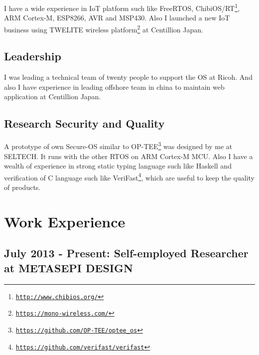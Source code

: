 \documentclass[letterpaper]{article}
\begin{document}
I have a wide experience in IoT platform such like FreeRTOS, ChibiOS/RT\footnote{\href{http://www.chibios.org/}{\tt http://www.chibios.org/}}, ARM Cortex-M, ESP8266, AVR and MSP430. Also I launched a new IoT business using TWELITE wireless platform\footnote{\href{https://mono-wireless.com/}{\tt https://mono-wireless.com/}} at Centillion Japan.

\subsection*{Leadership}

I was leading a technical team of twenty people to support the OS at Ricoh. And also I have experience in leading offshore team in china to maintain web application at Centillion Japan.

\subsection*{Research Security and Quality}

A prototype of own Secure-OS similar to OP-TEE\footnote{\href{https://github.com/OP-TEE/optee\_os}{\tt https://github.com/OP-TEE/optee\_os}} was designed by me at SELTECH. It runs with the other RTOS on ARM Cortex-M MCU. Also I have a wealth of experience in strong static typing language such like Haskell and verification of C language such like VeriFast\footnote{\href{https://github.com/verifast/verifast}{\tt https://github.com/verifast/verifast}}, which are useful to keep the quality of products.

\newpage

\section*{Work Experience}

\subsection*{July 2013 - Present: Self-employed Researcher at METASEPI DESIGN}
\end{document}
